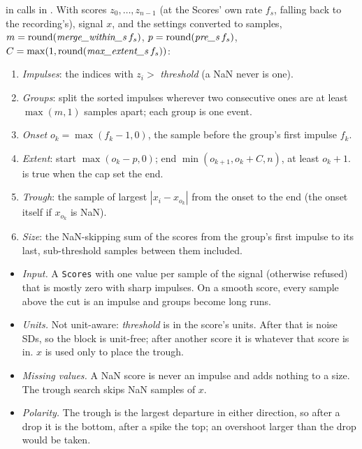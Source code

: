  in  calls  in
. With scores $z_0,\dots,z_{n-1}$ (at the
Scores' own rate $f_s$, falling back to the recording's), signal $x$, and the settings converted
to samples, $m = \operatorname{round}(\text{\emph{merge\_within\_s}}\,f_s)$,
$p = \operatorname{round}(\text{\emph{pre\_s}}\,f_s)$,
$C = \max(1, \operatorname{round}(\text{\emph{max\_extent\_s}}\,f_s))$:
\begin{enumerate}
\item \emph{Impulses}: the indices with $z_i >$ \emph{threshold} (a NaN never is one).
\item \emph{Groups}: split the sorted impulses wherever two consecutive ones are at least
  $\max(m, 1)$ samples apart; each group is one event.
\item \emph{Onset} $o_k = \max(f_k - 1, 0)$, the sample before the group's first impulse $f_k$.
\item \emph{Extent}: start $\max(o_k - p, 0)$; end $\min(o_{k+1}, o_k + C, n)$, at least
  $o_k + 1$.  is true when the cap set the end.
\item \emph{Trough}: the sample of largest $|x_i - x_{o_k}|$ from the onset to the end (the
  onset itself if $x_{o_k}$ is NaN).
\item \emph{Size}: the NaN-skipping sum of the scores from the group's first impulse to its
  last, sub-threshold samples between them included.
\end{enumerate}

\begin{itemize}
\item \emph{Input.} A \texttt{Scores} with one value per sample of the signal (otherwise
  refused) that is mostly zero with sharp impulses. On a smooth score, every sample above the
  cut is an impulse and groups become long runs.
\item \emph{Units.} Not unit-aware: \emph{threshold} is in the score's units. After
   that is noise SDs, so the block is unit-free; after another
  score it is whatever that score is in. $x$ is used only to place the trough.
\item \emph{Missing values.} A NaN score is never an impulse and adds nothing to a size.
  The trough search skips NaN samples of $x$.
\item \emph{Polarity.} The trough is the largest departure in either direction, so after a
  drop it is the bottom, after a spike the top; an overshoot larger than the drop would be taken.
\end{itemize}

